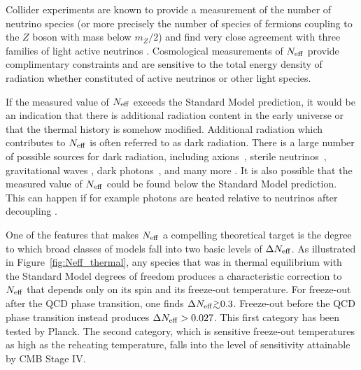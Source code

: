 Collider experiments are known to provide a measurement of the number of neutrino species (or more precisely the number of species of fermions coupling to the $Z$ boson with mass below $m_Z/2$) and find very close agreement with three families of light active neutrinos \cite{ALEPH:2005ab}.  Cosmological measurements of $N_{\rm eff}$ provide complimentary constraints and are sensitive to the total energy density of radiation whether constituted of active neutrinos or other light species.

If the measured value of $N_{\rm eff}$ exceeds the Standard Model prediction, it would be an indication that there is additional radiation content in the early universe or that the thermal history is somehow modified.  Additional radiation which contributes to $N_{\rm eff}$ is often referred to as dark radiation.  There is a large number of possible sources for dark radiation, including axions~\cite{Brust:2013xpv,Salvio:2013iaa,Kawasaki:2015ofa,Baumann:2016wac}, sterile neutrinos~\cite{Abazajian:2001nj,Strumia:2006db,Boyarsky:2009ix}, gravitational waves \cite{Boyle:2007zx,Stewart:2007fu,Meerburg:2015zua}, dark photons~\cite{Ackerman:2008gi,Kaplan:2011yj,CyrRacine:2012fz}, and many more \cite{Cadamuro:2010cz,Weinberg:2013kea}.  It is also possible that the measured value of $N_{\rm eff}$ could be found below the Standard Model prediction.  This can happen if for example photons are heated relative to neutrinos after decoupling \cite{Steigman:2013yua,Boehm:2013jpa}.

One of the features that makes $N_{\rm eff}$ a compelling theoretical target is the degree to which broad classes of models fall into two basic levels of $\Delta N_{\rm eff}$.  As illustrated in Figure~\ref{fig:Neff_thermal}, any species that was in thermal equilibrium with the Standard Model degrees of freedom produces a characteristic correction to $N_{\rm eff}$ that depends only on its spin and its freeze-out temperature.  For freeze-out after the QCD phase transition, one finds $\Delta \Neff \gtrsim 0.3$.  Freeze-out before the QCD phase transition instead produces $\Delta N_{\rm eff} > 0.027$.  This first category has been tested by Planck.  The second category, which is sensitive freeze-out temperatures as high as the reheating temperature, falls into the level of sensitivity attainable by CMB Stage IV.

